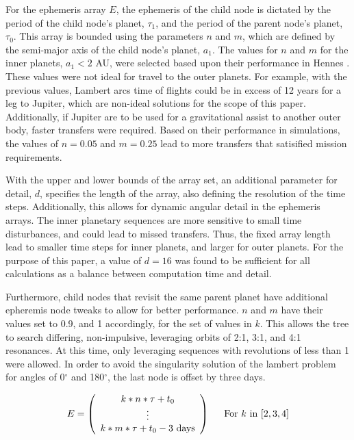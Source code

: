 \documentclass[letterpaper, preprint, paper,11pt]{AAS}	%
\begin{document}
For the ephemeris array $E$, the ephemeris of the child node is dictated by the period of the child node's planet, $\tau_1$, and the period of the parent node's planet, $\tau_0$. This array is bounded using the parameters $n$ and $m$, which are defined by the semi-major axis of the child node's planet, $a_1$. The values for $n$ and $m$ for the inner planets, $a_1 < 2$ AU, were selected based upon their performance in Hennes \cite{Hennes2015}. These values were not ideal for travel to the outer planets. For example, with the previous values, Lambert arcs time of flights could be in excess of 12 years for a leg to Jupiter, which are non-ideal solutions for the scope of this paper. Additionally, if Jupiter are to be used for a gravitational assist to another outer body, faster transfers were required. Based on their performance in simulations, the values of $n = 0.05$ and $m = 0.25$ lead to more transfers that satisified mission requirements. %

With the upper and lower bounds of the array set, an additional parameter for detail, $d$, specifies the length of the array, also defining the resolution of the time steps. Additionally, this allows for dynamic angular detail in the ephemeris arrays. The inner planetary sequences are more sensitive to small time disturbances, and could lead to missed transfers. Thus, the fixed array length lead to smaller time steps for inner planets, and larger for outer planets. For the purpose of this paper, a value of $d = 16$ was found to be sufficient for all calculations as a balance between computation time and detail. 

Furthermore, child nodes that revisit the same parent planet have additional epheremis node tweaks to allow for better performance. $n$ and $m$ have their values set to 0.9, and 1 accordingly, for the set of values in $k$. This allows the tree to search differing, non-impulsive, leveraging orbits of 2:1, 3:1, and 4:1 resonances. At this time, only leveraging sequences with revolutions of less than 1 were allowed. In order to avoid the singularity solution of the lambert problem for angles of 0$^\circ$ and 180$^\circ$, the last node is offset by three days.

\begin{equation}
    \label{eq:ephemArrayLev}
    E = 
    \left(\begin{array}{c}
        k*n*\tau + t_0 \\ 
        \vdots \\
        k*m*\tau + t_0 - 3 \text{ days} \\
    \end{array}\right)\hspace{1.5em}
    \text{For } k \text{ in } [2, 3, 4]
\end{equation}
\end{document}
